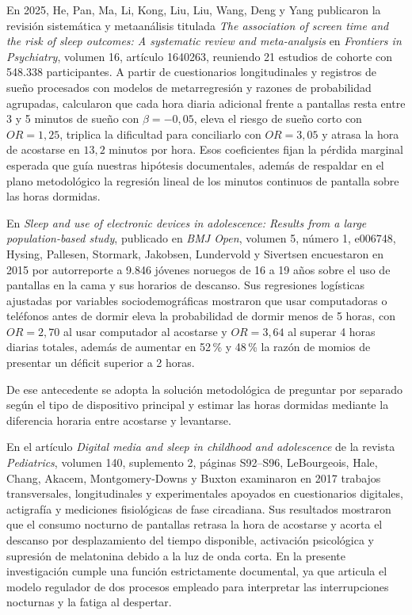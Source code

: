 \documentclass[12pt, letterpaper]{article}
\begin{document}
En 2025, He, Pan, Ma, Li, Kong, Liu, Liu, Wang, Deng y Yang publicaron la revisión sistemática y metaanálisis titulada \textit{The association of screen time and the risk of sleep outcomes: A systematic review and meta-analysis} en \textit{Frontiers in Psychiatry}, volumen 16, artículo 1640263, reuniendo 21 estudios de cohorte con 548.338 participantes. A partir de cuestionarios longitudinales y registros de sueño procesados con modelos de metarregresión y razones de probabilidad agrupadas, calcularon que cada hora diaria adicional frente a pantallas resta entre 3 y 5 minutos de sueño con $\beta = -0{,}05$, eleva el riesgo de sueño corto con $OR = 1{,}25$, triplica la dificultad para conciliarlo con $OR = 3{,}05$ y atrasa la hora de acostarse en $13{,}2$ minutos por hora. Esos coeficientes fijan la pérdida marginal esperada que guía nuestras hipótesis documentales, además de respaldar en el plano metodológico la regresión lineal de los minutos continuos de pantalla sobre las horas dormidas.

En \textit{Sleep and use of electronic devices in adolescence: Results from a large population-based study}, publicado en \textit{BMJ Open}, volumen 5, número 1, e006748, Hysing, Pallesen, Stormark, Jakobsen, Lundervold y Sivertsen encuestaron en 2015 por autorreporte a 9.846 jóvenes noruegos de 16 a 19 años sobre el uso de pantallas en la cama y sus horarios de descanso. Sus regresiones logísticas ajustadas por variables sociodemográficas mostraron que usar computadoras o teléfonos antes de dormir eleva la probabilidad de dormir menos de 5 horas, con $OR = 2{,}70$ al usar computador al acostarse y $OR = 3{,}64$ al superar 4 horas diarias totales, además de aumentar en 52\,\% y 48\,\% la razón de momios de presentar un déficit superior a 2 horas.

De ese antecedente se adopta la solución metodológica de preguntar por separado según el tipo de dispositivo principal y estimar las horas dormidas mediante la diferencia horaria entre acostarse y levantarse.

En el artículo \textit{Digital media and sleep in childhood and adolescence} de la revista \textit{Pediatrics}, volumen 140, suplemento 2, páginas S92--S96, LeBourgeois, Hale, Chang, Akacem, Montgomery-Downs y Buxton examinaron en 2017 trabajos transversales, longitudinales y experimentales apoyados en cuestionarios digitales, actigrafía y mediciones fisiológicas de fase circadiana. Sus resultados mostraron que el consumo nocturno de pantallas retrasa la hora de acostarse y acorta el descanso por desplazamiento del tiempo disponible, activación psicológica y supresión de melatonina debido a la luz de onda corta. En la presente investigación cumple una función estrictamente documental, ya que articula el modelo regulador de dos procesos empleado para interpretar las interrupciones nocturnas y la fatiga al despertar.
\end{document}
